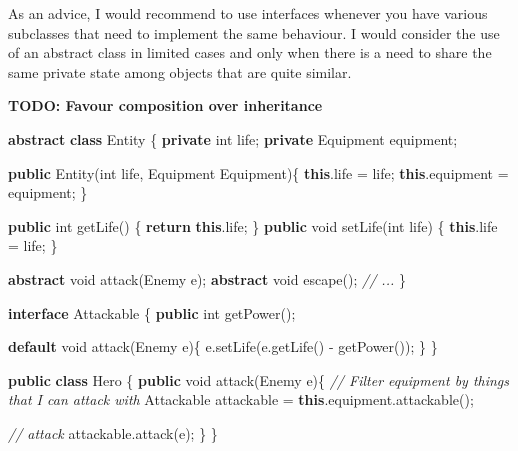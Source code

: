 \documentclass[]{article}
\newenvironment{Shaded}{\begin{snugshade}}{\end{snugshade}}
\newcommand{\KeywordTok}[1]{\textcolor[rgb]{0.13,0.29,0.53}{\textbf{{#1}}}}
\newcommand{\DataTypeTok}[1]{\textcolor[rgb]{0.13,0.29,0.53}{{#1}}}
\newcommand{\CommentTok}[1]{\textcolor[rgb]{0.56,0.35,0.01}{\textit{{#1}}}}
\newcommand{\FunctionTok}[1]{\textcolor[rgb]{0.00,0.00,0.00}{{#1}}}
\newcommand{\BuiltInTok}[1]{{#1}}
\newcommand{\NormalTok}[1]{{#1}}
\begin{document}
As an advice, I would recommend to use interfaces whenever you have
various subclasses that need to implement the same behaviour. I would
consider the use of an abstract class in limited cases and only when
there is a need to share the same private state among objects that are
quite similar.

\textbf{TODO: Favour composition over inheritance}

\begin{Shaded}
\begin{Highlighting}[]
\KeywordTok{abstract} \KeywordTok{class} \BuiltInTok{Entity} \NormalTok{\{}
  \KeywordTok{private} \DataTypeTok{int} \NormalTok{life;}
  \KeywordTok{private} \NormalTok{Equipment equipment;}

  \KeywordTok{public} \BuiltInTok{Entity}\NormalTok{(}\DataTypeTok{int} \NormalTok{life, Equipment Equipment)\{}
    \KeywordTok{this}\NormalTok{.}\FunctionTok{life} \NormalTok{= life;}
    \KeywordTok{this}\NormalTok{.}\FunctionTok{equipment} \NormalTok{= equipment;}
  \NormalTok{\}}

  \KeywordTok{public} \DataTypeTok{int} \FunctionTok{getLife}\NormalTok{() \{ }\KeywordTok{return} \KeywordTok{this}\NormalTok{.}\FunctionTok{life}\NormalTok{; \}}
  \KeywordTok{public} \DataTypeTok{void} \FunctionTok{setLife}\NormalTok{(}\DataTypeTok{int} \NormalTok{life) \{ }\KeywordTok{this}\NormalTok{.}\FunctionTok{life} \NormalTok{= life; \}}

  \KeywordTok{abstract} \DataTypeTok{void} \FunctionTok{attack}\NormalTok{(Enemy e);}
  \KeywordTok{abstract} \DataTypeTok{void} \FunctionTok{escape}\NormalTok{();}
  \CommentTok{// ...}
\NormalTok{\}}

\KeywordTok{interface} \NormalTok{Attackable \{}
  \KeywordTok{public} \DataTypeTok{int} \FunctionTok{getPower}\NormalTok{();}

  \KeywordTok{default} \DataTypeTok{void} \FunctionTok{attack}\NormalTok{(Enemy e)\{}
    \NormalTok{e.}\FunctionTok{setLife}\NormalTok{(e.}\FunctionTok{getLife}\NormalTok{() - }\FunctionTok{getPower}\NormalTok{());}
  \NormalTok{\}}
\NormalTok{\}}

\KeywordTok{public} \KeywordTok{class} \NormalTok{Hero \{}
  \KeywordTok{public} \DataTypeTok{void} \FunctionTok{attack}\NormalTok{(Enemy e)\{}
    \CommentTok{// Filter equipment by things that I can attack with}
    \NormalTok{Attackable attackable = }\KeywordTok{this}\NormalTok{.}\FunctionTok{equipment}\NormalTok{.}\FunctionTok{attackable}\NormalTok{();}

    \CommentTok{// attack}
    \NormalTok{attackable.}\FunctionTok{attack}\NormalTok{(e);}
  \NormalTok{\}}
\NormalTok{\}}
\end{Highlighting}
\end{Shaded}
\end{document}
